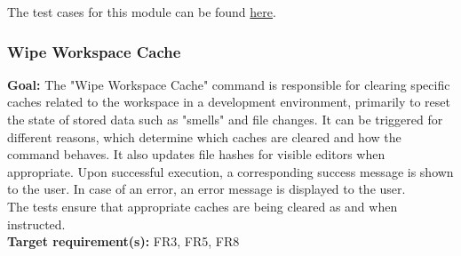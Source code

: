 \documentclass[12pt, titlepage]{article}
\begin{document}
\noindent The test cases for this module can be found \href{https://github.com/ssm-lab/capstone--sco-vs-code-plugin/blob/plugin-multi-file/test/utils/handleSmellSettings.test.ts}{here}.

\subsubsection{Wipe Workspace Cache}

\textbf{Goal:} The "Wipe Workspace Cache" command is responsible for clearing specific caches related to the workspace in a development environment, primarily to reset the state of stored data such as "smells" and file changes. It can be triggered for different reasons, which determine which caches are cleared and how the command behaves. It also updates file hashes for visible editors when appropriate. Upon successful execution, a corresponding success message is shown to the user. In case of an error, an error message is displayed to the user.\\

\noindent The tests ensure that appropriate caches are being cleared as and when instructed.\\

\noindent \textbf{Target requirement(s):} FR3, FR5, FR8~\cite{SRS} \\
\end{document}

